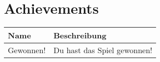 \section{Achievements}

%


\begin{table}[ht]
  \caption{Achievements}
  \small
  \begin{longtabu}{X[-1]X}
    \toprule
    Name & Beschreibung \\
    \midrule\endhead

    Gewonnen!
      & Du hast das Spiel gewonnen!
      \\

    \bottomrule
  \end{longtabu}
\end{table}
